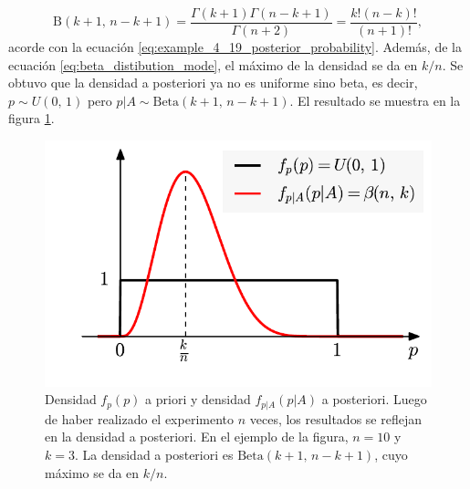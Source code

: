 \documentclass[a4paper]{report}
\begin{document}
\[
 \mathrm{B}(k+1,\,n-k+1)=\frac{\Gamma(k+1)\Gamma(n-k+1)}{\Gamma(n+2)}=\frac{k!(n-k)!}{(n+1)!},
\]
acorde con la ecuación \ref{eq:example_4_19_posterior_probability}. Además, de la ecuación \ref{eq:beta_distibution_mode}, el máximo de la densidad se da en \(k/n\).
Se obtuvo que la densidad a posteriori ya no es uniforme sino beta, es decir, \(p\sim U(0,\,1)\) pero \(p|A\sim\mathrm{Beta}(k+1,\,n-k+1)\). El resultado se muestra en la figura \ref{fig:flip_coin_posterior_probability}.
\begin{figure}[!htb]
  \begin{minipage}[c]{0.52\textwidth}
    \includegraphics[width=\textwidth]{figuras/flip_coin_posterior_probability.pdf}
  \end{minipage}\hfill
  \begin{minipage}[c]{0.45\textwidth}
    \caption{
       Densidad \(f_p(p)\) a priori y densidad \(f_{p|A}(p|A)\) a posteriori. Luego de haber realizado el experimento \(n\) veces, los resultados se reflejan en la densidad a posteriori. En el ejemplo de la figura, \(n=10\) y \(k=3\). La densidad a posteriori es \(\mathrm{Beta}(k+1,\,n-k+1)\), cuyo máximo se da en \(k/n\).
    } \label{fig:flip_coin_posterior_probability}
  \end{minipage}
\end{figure}
\end{document}
